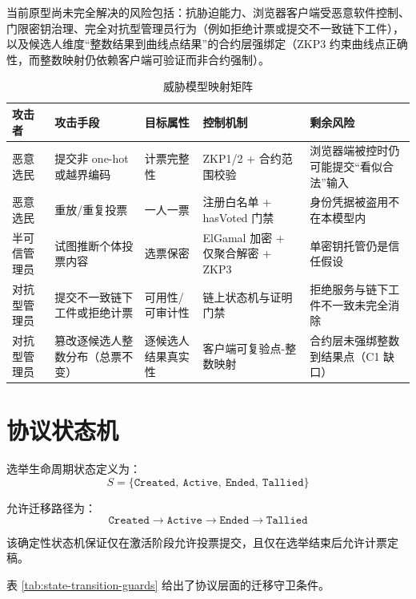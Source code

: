当前原型尚未完全解决的风险包括：抗胁迫能力、浏览器客户端受恶意软件控制、门限密钥治理、完全对抗型管理员行为（例如拒绝计票或提交不一致链下工件），以及候选人维度“整数结果到曲线点结果”的合约层强绑定（ZKP3 约束曲线点正确性，而整数映射仍依赖客户端可验证而非合约强制）。


\begin{table}[htbp]
\centering
\small
\caption{威胁模型映射矩阵}
\label{tab:threat-matrix}
\begin{tabular}{L{2.0cm} L{2.6cm} L{2.2cm} L{2.8cm} L{2.8cm}}
\toprule
攻击者 & 攻击手段 & 目标属性 & 控制机制 & 剩余风险 \\
\midrule
恶意选民 & 提交非 one-hot 或越界编码 & 计票完整性 & ZKP1/2 + 合约范围校验 & 浏览器端被控时仍可能提交“看似合法”输入 \\
恶意选民 & 重放/重复投票 & 一人一票 & 注册白名单 + hasVoted 门禁 & 身份凭据被盗用不在本模型内 \\
半可信管理员 & 试图推断个体投票内容 & 选票保密 & ElGamal 加密 + 仅聚合解密 + ZKP3 & 单密钥托管仍是信任假设 \\
对抗型管理员 & 提交不一致链下工件或拒绝计票 & 可用性/可审计性 & 链上状态机与证明门禁 & 拒绝服务与链下工件不一致未完全消除 \\
对抗型管理员 & 篡改逐候选人整数分布（总票不变） & 逐候选人结果真实性 & 客户端可复验点-整数映射 & 合约层未强绑整数到结果点（C1 缺口） \\
\bottomrule
\end{tabular}
\end{table}

\section{协议状态机}

选举生命周期状态定义为：
\begin{equation}
S = \{\texttt{Created},\ \texttt{Active},\ \texttt{Ended},\ \texttt{Tallied}\}
\end{equation}

允许迁移路径为：
\begin{equation}
\texttt{Created} \rightarrow \texttt{Active} \rightarrow \texttt{Ended} \rightarrow \texttt{Tallied}
\end{equation}

该确定性状态机保证仅在激活阶段允许投票提交，且仅在选举结束后允许计票定稿。

表 \ref{tab:state-transition-guards} 给出了协议层面的迁移守卫条件。

